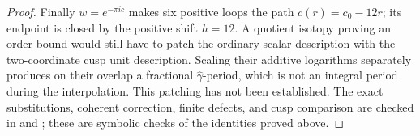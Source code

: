 \begin{proof}
Finally \(w=e^{-\pi i c}\) makes six positive loops the path
\(c(r)=c_0-12r\); its endpoint is closed by the positive shift
\(h=12\). A quotient isotopy proving an order bound would still
have to patch the ordinary scalar description with the two-coordinate
cusp unit description. Scaling their additive logarithms separately
produces on their overlap a fractional
\(\widehat\gamma\)-period, which is not an integral period during
the interpolation. This patching has not been established. The
exact substitutions, coherent correction, finite defects, and
cusp comparison are checked in
 and
; these are symbolic checks of the
identities proved above.
\end{proof}
